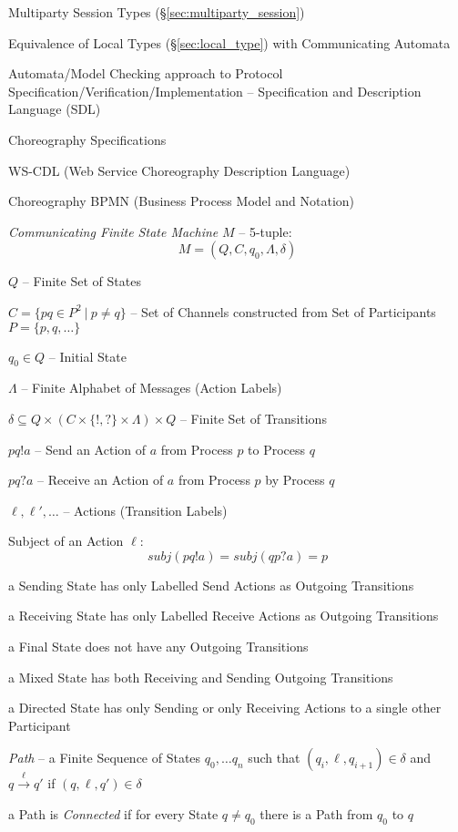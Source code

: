 Multiparty Session Types (\S\ref{sec:multiparty_session})

Equivalence of Local Types (\S\ref{sec:local_type}) with Communicating
Automata

Automata/Model Checking approach to Protocol
Specification/Verification/Implementation -- Specification and
Description Language (SDL)

Choreography Specifications

WS-CDL (Web Service Choreography Description Language)

Choreography BPMN (Business Process Model and Notation)

\emph{Communicating Finite State Machine} $M$ -- 5-tuple:
\[
  M = (Q,C,q_0,\Lambda,\delta)
\]

$Q$ -- Finite Set of States

$C = \{pq \in P^2 \ |\ p \neq q\}$ -- Set of Channels constructed from
Set of Participants $P = \{ p, q, \ldots \}$

$q_0 \in Q$ -- Initial State

$\Lambda$ -- Finite Alphabet of Messages (Action Labels)

$\delta \subseteq Q \times (C \times \{!,?\} \times \Lambda) \times Q$
-- Finite Set of Transitions

$pq!a$ -- Send an Action of $a$ from Process $p$ to Process $q$

$pq?a$ -- Receive an Action of $a$ from Process $p$ by Process $q$

$\ell, \ell', \ldots$ -- Actions (Transition Labels)

Subject of an Action $\ell$:
\[
  subj(pq!a) = subj(qp?a) = p
\]

a Sending State has only Labelled Send Actions as Outgoing Transitions

a Receiving State has only Labelled Receive Actions as Outgoing
Transitions

a Final State does not have any Outgoing Transitions

a Mixed State has both Receiving and Sending Outgoing Transitions

a Directed State has only Sending or only Receiving Actions to a
single other Participant

\emph{Path} -- a Finite Sequence of States $q_0, \ldots q_n$ such that
$(q_i, \ell, q_{i+1}) \in \delta$ and $q \xrightarrow{\ell} q'$ if
$(q,\ell,q') \in \delta$

a Path is \emph{Connected} if for every State $q \neq q_0$ there is a
Path from $q_0$ to $q$

